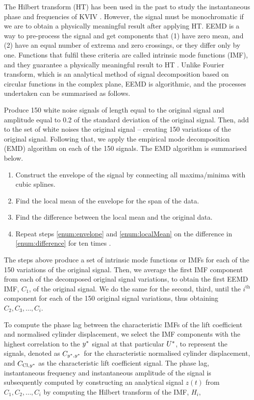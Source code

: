 \documentclass[a4paper,fleqn]{cas-sc}
\begin{document}
The Hilbert transform (HT) has been used in the past to study the instantaneous phase and frequencies of KVIV \citep{Khalak1999}. However, the signal must be monochromatic if we are to obtain a physically meaningful result after applying HT. EEMD is a way to pre-process the signal and get components that (1) have zero mean, and (2) have an equal number of extrema and zero crossings, or they differ only by one. Functions that fulfil these criteria are called intrinsic mode functions (IMF), and they guarantee a physically meaningful result to HT \citep{Gumelar2019,Zhou2019}. Unlike Fourier transform, which is an analytical method of signal decomposition based on circular functions in the complex plane, EEMD is algorithmic, and the processes undertaken can be summarised as follows.

Produce 150 white noise signals of length equal to the original signal and amplitude equal to 0.2 of the standard deviation of the original signal. Then, add to the set of white noises the original signal -- creating 150 variations of the original signal. Following that, we apply the empirical mode decomposition (EMD) algorithm on each of the 150 signals. The EMD algorithm is summarised below.

\begin{enumerate} \label{enumerate:emd}
  \item Construct the envelope of the signal by connecting all maxima/minima with cubic splines. \label{enum:envelope}
  \item Find the local mean of the envelope for the span of the data. \label{enum:localMean}
  \item Find the difference between the local mean and the original data. \label{enum:difference}
  \item Repeat steps \ref{enum:envelope} and \ref{enum:localMean} on the difference in \ref{enum:difference} for ten times \citep{Wu2008}.
\end{enumerate}

The steps above produce a set of intrinsic mode functions or IMFs for each of the 150 variations of the original signal. Then, we average the first IMF component from each of the decomposed original signal variations, to obtain the first EEMD IMF, $C_{1}$, of the original signal. We do the same for the second, third, until the $i^{\text{th}}$ component for each of the 150 original signal variations, thus obtaining $C_{2},C_{3},\dots,C_{i}$.

To compute the phase lag between the characteristic IMFs of the lift coefficient and normalised cylinder displacement, we select the IMF components with the highest correlation to the $y^{*}$ signal at that particular $U^{*}$, to represent the signals, denoted as $C_{y^{*},y^{*}}$ for the characteristic normalised cylinder displacement, and $C_{\text{Cl},y^{*}}$ as the characteristic lift coefficient signal. The phase lag, instantaneous frequency and instantaneous amplitude of the signal is subsequently computed by constructing an analytical signal $z \left( t \right)$ from $C_{1},C_{2},\dots,C_{i}$ by computing the Hilbert transform of the IMF, $H_{i}$,
\end{document}
